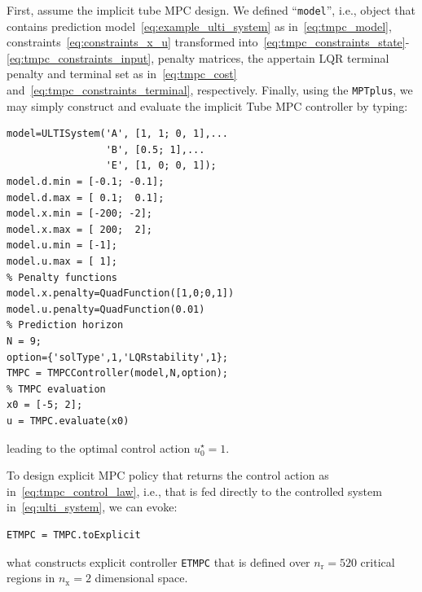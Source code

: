 \documentclass[letterpaper, 10 pt, conference]{ieeeconf}
\begin{document}
First, assume the implicit tube MPC design. We defined ``\verb|model|'', i.e., object that contains prediction model~\eqref{eq:example_ulti_system} as in~\eqref{eq:tmpc_model}, constraints~\eqref{eq:constraints_x_u} transformed into~\eqref{eq:tmpc_constraints_state}-\eqref{eq:tmpc_constraints_input}, penalty matrices, the appertain LQR terminal penalty and terminal set as in~\eqref{eq:tmpc_cost} and~\eqref{eq:tmpc_constraints_terminal}, respectively. 
Finally, using the \texttt{MPTplus}, we may simply construct and evaluate the implicit Tube MPC controller by typing:
\begin{lstlisting}[style=Matlab-editor]
model=ULTISystem('A', [1, 1; 0, 1],...
                 'B', [0.5; 1],...
                 'E', [1, 0; 0, 1]);
model.d.min = [-0.1; -0.1]; 
model.d.max = [ 0.1;  0.1];
model.x.min = [-200; -2]; 
model.x.max = [ 200;  2];
model.u.min = [-1];
model.u.max = [ 1];
% Penalty functions
model.x.penalty=QuadFunction([1,0;0,1])
model.u.penalty=QuadFunction(0.01)
% Prediction horizon
N = 9;
option={'solType',1,'LQRstability',1};
TMPC = TMPCController(model,N,option);
% TMPC evaluation
x0 = [-5; 2];
u = TMPC.evaluate(x0)
\end{lstlisting}
leading to the optimal control action $u_{0}^{\star} = 1$.

%

To design explicit MPC policy that returns the control action as in~\eqref{eq:tmpc_control_law}, i.e., that is fed directly to the controlled system in~\eqref{eq:ulti_system}, we can evoke:
\begin{lstlisting}[style=Matlab-editor]
ETMPC = TMPC.toExplicit
\end{lstlisting}
what constructs explicit controller \verb|ETMPC| that is defined over $n_\text{r} = 520$ critical regions in $n_\text{x} = 2$ dimensional space.
\end{document}
